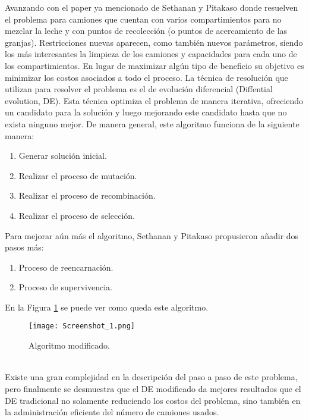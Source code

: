 \documentclass[letter, 10pt]{article}
\begin{document}
Avanzando con el paper ya mencionado de Sethanan y Pitakaso donde resuelven el problema para camiones que cuentan con varios compartimientos para no mezclar la leche y con puntos de recolecci\'on (o puntos de acercamiento de las granjas)\cite{Compartimientos}. Restricciones nuevas aparecen, como tambi\'en nuevos par\'ametros, siendo los m\'as interesantes la limpieza de los camiones y capacidades para cada uno de los compartimientos. En lugar de maximizar alg\'un tipo de beneficio su objetivo es minimizar los costos asociados a todo el proceso. La t\'ecnica de resoluci\'on que utilizan para resolver el problema es el de evoluci\'on diferencial (Diffential evolution, DE). Esta t\'ecnica optimiza el problema de manera iterativa, ofreciendo un candidato para la soluci\'on y luego mejorando este candidato hasta que no exista ninguno mejor. De manera general, este algoritmo funciona de la siguiente manera:
\begin{enumerate}
    \item Generar soluci\'on inicial.
    \item Realizar el proceso de mutaci\'on.
    \item Realizar el proceso de recombinaci\'on.
    \item Realizar el proceso de selecci\'on.
\end{enumerate}

Para mejorar a\'un m\'as el algoritmo, Sethanan y Pitakaso propusieron a\~{n}adir dos pasos m\'as:
\begin{enumerate}
    \item Proceso de reencarnaci\'on.
    \item Proceso de supervivencia.
\end{enumerate}

En la Figura \ref{process} se puede ver como queda este algoritmo.

\begin{figure}[H]
\centering
\texttt{[image: Screenshot\_1.png]}
\caption{Algoritmo modificado.}
\label{process}
\end{figure} \\

Existe una gran complejidad en la descripci\'on del paso a paso de este problema, pero finalmente se desmuestra que el DE modificado da mejores resultados que el DE tradicional no solamente reduciendo los costos del problema, sino tambi\'en en la administraci\'on eficiente del n\'umero de camiones usados. \\
\end{document}

